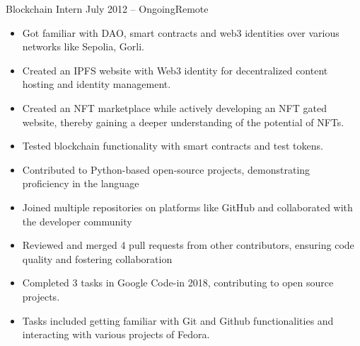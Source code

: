 \documentclass[10pt,a4paper,ragged2e,withhyper]{altacv}
\begin{document}
\begin{paracol}{2}


 {Blockchain Intern} 
{July 2012 -- Ongoing}{Remote}
\begin{itemize}

\item Got familiar with DAO, smart contracts and web3 identities over various networks like Sepolia, Gorli.
\item Created an IPFS website with Web3 identity for decentralized content hosting and identity management.
\item Created an NFT marketplace while actively developing an NFT gated website, thereby gaining a deeper understanding of the potential of NFTs.
\item Tested blockchain functionality with smart contracts and test tokens.
\end{itemize}

\divider

\begin{itemize}
\item  Contributed to Python-based open-source projects, demonstrating \\proficiency in the language
\item  Joined multiple repositories on platforms like GitHub and collaborated with the developer community
\item  Reviewed and merged 4 pull requests from other contributors, ensuring code quality and fostering collaboration
\end{itemize}

\divider

\begin{itemize}
\item Completed 3 tasks in Google Code-in 2018, contributing to open source projects.
\item Tasks included getting familiar with Git and Github functionalities and interacting with various projects of Fedora.
\end{itemize}



\end{paracol}
\end{document}

